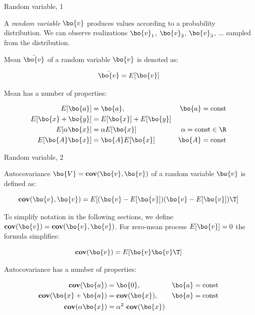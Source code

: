 \documentclass{beamer}
\begin{document}
\begin{frame}{Random variable, 1}
\begin{flushleft}

A \emph{random variable} $\bo{v}$ produces values according to a probability distribution. We can observe realizations $\bo{v}_1$, $\bo{v}_2$, $\bo{v}_3$, ... sampled from the distribution.

\bigskip

Mean $\bar{\bo{v}}$ of a random variable $\bo{v}$ is denoted as:

\begin{equation}
	\bar{\bo{v}} = E[\bo{v}]
\end{equation}

Mean has a number of properties:

\begin{align}
	E[\bo{a}] &= \bo{a}, & \bo{a}= \text{const} \\
	E[\bo{x}+\bo{y}] &= E[\bo{x}] + E[\bo{y}] &\\
	E[\alpha \bo{x}] &= \alpha  E[\bo{x}]  & \alpha = \text{const} \in \R \\
	E[\bo{A} \bo{x}] &= \bo{A}  E[\bo{x}] & \bo{A} = \text{const}
\end{align}


\end{flushleft}
\end{frame}



\begin{frame}{Random variable, 2}
	\begin{flushleft}
		
		Autocovariance $\bo{V} = \textbf{cov}(\bo{v}, \bo{v})$ of a random variable $\bo{v}$ is defined as:
		
		\begin{equation}
			\textbf{cov}(\bo{v}, \bo{v}) = E[(\bo{v} - E[\bo{v}])(\bo{v} - E[\bo{v}])\T]
		\end{equation}
	
		To simplify notation in the following sections, we define $\textbf{cov}(\bo{v}) = \textbf{cov}(\bo{v}, \bo{v})$. For zero-mean process $E[\bo{v}] = 0$ the formula simplifies:
		
		\begin{equation}
			\textbf{cov}(\bo{v}) = E[\bo{v}\bo{v}\T]
		\end{equation}
		
		Autocovariance has a number of properties:
		
		\begin{align}
			\textbf{cov}(\bo{a}) &= \bo{0}, & \bo{a}= \text{const} 
			\\
			\textbf{cov}(\bo{x}+\bo{a}) &= \textbf{cov}(\bo{x}), & \bo{a}= \text{const} 
			\\
			\textbf{cov}(\alpha \bo{x}) &= \alpha^2 \ \textbf{cov}(\bo{x}) &
		\end{align}
		
		
		
	\end{flushleft}
\end{frame}
\end{document}
